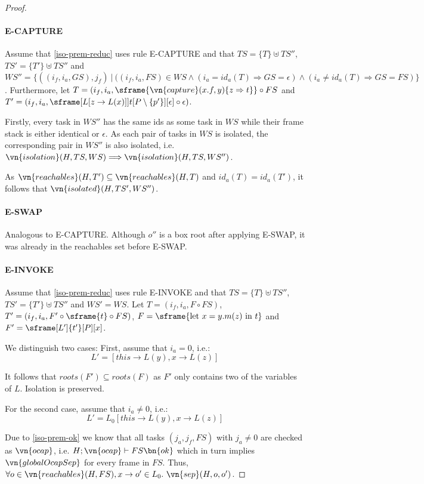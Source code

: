 \begin{proof}
\paragraph{E-CAPTURE}
Assume that \cref{iso-prem-reduc} uses rule E-CAPTURE and that $TS = \{ T \} \uplus TS''$, $TS' = \{ T' \} \uplus TS''$ and $WS'' = \{((i_f, i_a, GS), j_f)\ |\ ((i_f, i_a, FS) \in WS \wedge (i_a = id_a(T) \Longrightarrow GS = \epsilon) \wedge (i_a \neq id_a(T) \Longrightarrow GS = FS)\}$. Furthermore, let $T = (i_f, i_a, \sframe{\vn{capture}(x.f, y) \{z \Rightarrow t\}} \circ FS$ and $T' = (i_f, i_a, \sframe[L[z \rightarrow L(x)]]{t}[P \setminus \{p'\}][\epsilon] \circ \epsilon)$.

Firstly, every task in $WS''$ has the same ids as some task in $WS$ while their frame stack is either identical or $\epsilon$. As each pair of tasks in $WS$ is isolated, the corresponding pair in $WS''$ is also isolated, i.e. $\vn{isolation}(H, TS, WS) \Longrightarrow \vn{isolation}(H, TS, WS'')$.

As $\vn{reachables}(H, T') \subseteq \vn{reachables}(H, T)$ and $id_a(T) = id_a(T')$, it follows that $\vn{isolated}(H, TS', WS'')$.

\paragraph{E-SWAP}
Analogous to E-CAPTURE. Although $o''$ is a box root after applying E-SWAP, it was already in the reachables set before E-SWAP.

\paragraph{E-INVOKE}
Assume that \cref{iso-prem-reduc} uses rule E-INVOKE and that $TS = \{ T \} \uplus TS''$, $TS' = \{ T' \} \uplus TS''$ and $WS' = WS$. Let $T = (i_f, i_a, F \circ FS)$, $T' = (i_f, i_a, F' \circ \sframe{t} \circ FS)$, $F = \sframe{\text{let } x = y.m(z) \text{ in } t}$ and $F' = \sframe[L']{t'}[P][x]$.

We distinguish two cases: First, assume that $i_a = 0$, i.e.:
\[
    L' = [this \rightarrow L(y), x \rightarrow L(z)]
\]

It follows that $roots(F') \subseteq roots(F)$ as $F'$ only contains two of the variables of $L$. Isolation is preserved.

For the second case, assume that $i_a \neq 0$, i.e.:
\[
    L' = L_0 [this \rightarrow L(y), x \rightarrow L(z)]
\]

Due to \cref{iso-prem-ok} we know that all tasks $(j_a, j_f, FS)$ with $j_a \neq 0$ are checked as $\vn{ocap}$, i.e. $H; \vn{ocap} \vdash FS \bn{ok}$ which in turn implies $\vn{globalOcapSep}$ for every frame in $FS$. Thus, $\forall o \in \vn{reachables}(H, FS), x \rightarrow o' \in L_0.\ \vn{sep}(H, o, o')$.


\end{proof}
